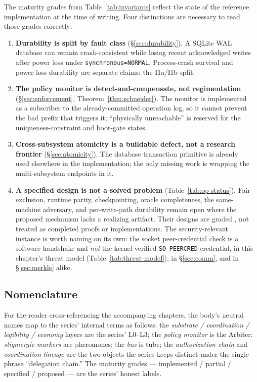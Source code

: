 \documentclass[11pt,a4paper]{article}
\theoremstyle{definition}
\theoremstyle{remark}
\begin{document}
The maturity grades from Table~\ref{tab:invariants} reflect the state of the
reference implementation at the time of writing. Four distinctions are necessary
to read those grades correctly:

\begin{enumerate}[leftmargin=1.6em]
\item \textbf{Durability is split by fault class} (\S\ref{sec:durability}). A
SQLite WAL database can remain crash-consistent while losing recent acknowledged
writes after power loss under \texttt{synchronous=NORMAL}. Process-crash survival
and power-loss durability are separate claims: the I1a/I1b split.
\item \textbf{The policy monitor is detect-and-compensate, not regimentation}
(\S\ref{sec:enforcement}, Theorem~\ref{thm:schneider}). The monitor is implemented
as a subscriber to the already-committed operation log, so it cannot prevent the
bad prefix that triggers it; ``physically unreachable'' is reserved for the
uniqueness-constraint and boot-gate states.
\item \textbf{Cross-subsystem atomicity is a buildable defect, not a research frontier}
(\S\ref{sec:atomicity}). The database transaction primitive is already used
elsewhere in the implementation; the only missing work is wrapping the multi-subsystem
endpoints in it.
\item \textbf{A specified design is not a solved problem}
(Table~\ref{tab:op-status}). Fair exclusion, runtime parity, checkpointing, oracle
completeness, the same-machine adversary, and per-write-path durability remain
open where the proposed mechanism lacks a realizing artifact. Their designs are
graded \Designed{}, not treated as completed proofs or implementations. The
security-relevant instance is worth naming on its own: the socket
peer-credential check is a software handshake and \emph{not} the kernel-verified
\texttt{SO\_PEERCRED} credential, in this chapter's threat model
(Table~\ref{tab:threat-model}), in \S\ref{sec:comm}, and in \S\ref{sec:merkle}
alike.
\end{enumerate}

\subsection{Nomenclature}

For the reader cross-referencing the accompanying chapters, the body's neutral names map
to the series' internal terms as follows: the \emph{substrate / coordination /
legibility / economy} layers are the series' L0--L3; the \emph{policy monitor} is
the Arbiter; \emph{stigmergic markers} are pheromones; the \emph{bus} is tube; the
\emph{authorization chain} and \emph{coordination lineage} are the two objects the
series keeps distinct under the single phrase ``delegation chain.'' The maturity
grades --- implemented / partial / specified / proposed --- are the series' honest
labels.
\end{document}
